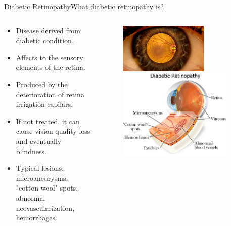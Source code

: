 \documentclass{beamer}
\begin{document}
\begin{frame}{Diabetic Retinopathy}{What diabetic retinopathy is?}
\begin{columns}
	\begin{column}{0.5\textwidth}
		\begin{itemize}
			\item {Disease derived from diabetic condition.}
			\item{Affects to the sensory elements of the retina.}
			\item{Produced by the deterioration of retina irrigation capilars.}
			\item{If not treated, it can cause vision quality loss and eventually blindness.}
			\item{Typical lesions: microaneurysms, "cotton wool" spots, abnormal neovascularization, hemorrhages. }
		\end{itemize}	
	\end{column}
	\begin{column}{0.5\textwidth}  %
		\begin{figure}[p]
			\centering
			\includegraphics[width=0.7\textwidth]{eye_dilated_pupil_retina.jpg}
			\\
			\includegraphics[width=0.9\textwidth]{DiabeticRetinopathy_431x334.jpg}
		\end{figure}
	\end{column}
\end{columns}
\end{frame}
\end{document}
